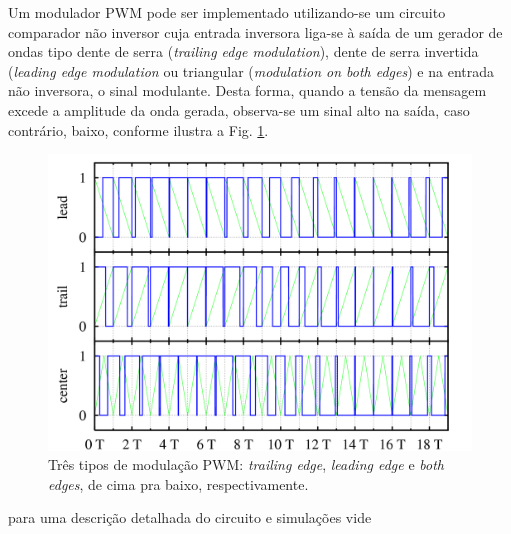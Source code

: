 Um modulador PWM pode ser implementado utilizando-se um circuito comparador não inversor cuja entrada inversora liga-se à saída de um gerador de 
ondas tipo dente de serra (\textit{trailing edge modulation}), dente de serra invertida (\textit{leading edge modulation}  ou triangular 
(\textit{modulation on both edges}) e na entrada não inversora, o sinal modulante. 
Desta forma, quando a tensão da mensagem excede a amplitude da onda gerada, observa-se um sinal alto na saída, caso contrário, baixo, conforme 
ilustra a Fig. \ref{pwm_modulation_types}.

  \begin{figure}[H] %
    \centering
    \includegraphics[width=0.7\linewidth]{../../Imagens/PWM_modulation_types.png}
    \caption{Três tipos de modulação PWM: \textit{trailing edge}, \textit{leading edge} e  \textit{both edges}, de cima pra baixo, respectivamente.}
    \label{pwm_modulation_types}
  \end{figure}
  
para uma descrição detalhada do circuito e simulações vide \cite{pwm_modulator}
  
%  
% 
% 

